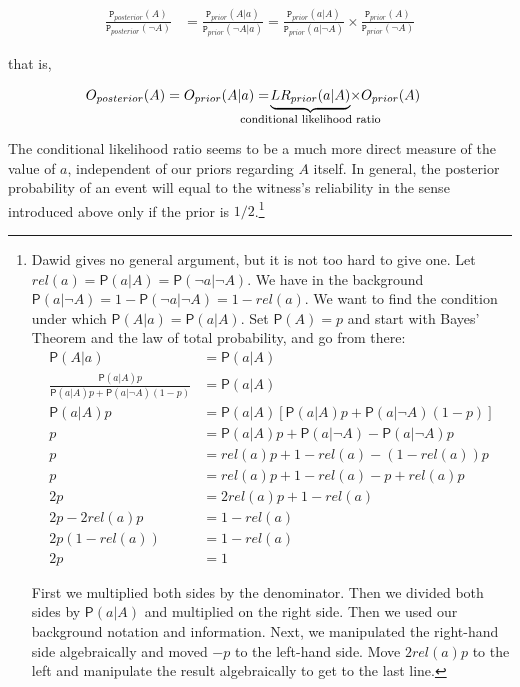 \documentclass[10pt,dvipsnames,enabledeprecatedfontcommands]{scrartcl}
\newcommand{\n}{\neg}
\newcommand{\pr}[1]{\mathsf{P}(#1)}
\newcommand{\prr}[1]{\mbox{$\mathtt{P}_{prior}(#1)$}}
\newcommand{\prp}[1]{\mbox{$\mathtt{P}_{posterior}(#1)$}}
\begin{document}
\vspace{-6mm}

\begin{align*}
 \frac{\prp{A}}{\prp{\n A}} & = \frac{\prr{A\vert a}}{\prr{\n A\vert a}}
 =
 \frac{\prr{a\vert A}}{\prr{a\vert \n A}}
 \times
 \frac{\prr{A}}{\prr{\n A}}
  \end{align*}

that is,

\vspace{-6mm}

\begin{align}
 \label{bayesodss2}
 O_{posterior}(A)& = O_{prior}(A\vert a) = \!\!\!\!\!  \!\!\!\!\!  \!\! \!\!  \underbrace{LR_{prior}(a\vert A)}_{\mbox{\footnotesize conditional likelihood ratio}}  \!\!\!\!\!   \!\!\!\!\!  \!\! \!\!   \times  O_{prior}(A)
 \end{align}

The conditional likelihood ratio seems to be a much more direct measure
of the value of \(a\), independent of our priors regarding \(A\) itself.
In general, the posterior probability of an event will equal to the
witness's reliability in the sense introduced above only if the prior is
\(1/2\).\footnote{Dawid gives no general argument, but it is not too hard to  give one. Let $rel(a)=\pr{a\vert A}=\pr{\n a\vert \n A}$. We have in the background $\pr{a\vert \n A}=1-\pr{\n a\vert \n A}=1-rel(a)$.
 We want to find the condition under which $\pr{A\vert a} = \pr{a\vert A}$. Set $\pr{A}=p$ and  start with Bayes' Theorem and the law of total probability, and go from there:
 \begin{align*}
 \pr{A\vert a}& = \pr{a\vert A}\\
 \frac{\pr{a\vert A}p}{\pr{a\vert A}p+\pr{a\vert \n A}(1-p)} &= \pr{a\vert A} \\
 \pr{a\vert A}p & = \pr{a\vert A}[\pr{a\vert A}p+\pr{a\vert \n A}(1-p)]\\
 p & = \pr{a\vert A}p + \pr{a\vert \n A} - \pr{a\vert \n A}p\\
 p &= rel(a) p + 1-rel(a)- (1-rel(a))p\\
 p & = rel(a)p +1 - rel(a) -p +rel(a)p \\
 2p & =  2rel(a)p + 1 - rel(a)  \\
 2p - 2 rel(a)p & = 1-rel(a)\\
 2p(1-rel(a)) &= 1-rel(a)\\
 2p & = 1
 \end{align*}

\noindent  First we multiplied both sides by the denominator. Then we divided both sides by $\pr{a\vert A}$ and multiplied on the right side. Then we used our background notation and information. Next, we manipulated the right-hand side algebraically and  moved  $-p$ to the left-hand side. Move $2rel(a)p$ to the left and manipulate the result algebraically to get to the last line.}
\end{document}
